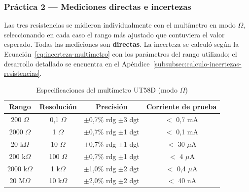 \subsubsection{Práctica 2 --- Mediciones directas e incertezas}

Las tres resistencias se midieron individualmente con el multímetro en modo $\Omega$, seleccionando en cada caso el rango más ajustado que contuviera el valor esperado.
Todas las mediciones son \textbf{directas}.
La incerteza se calculó según la Ecuación~\ref{eq:incerteza-multimetro} con los parámetros del rango utilizado; el desarrollo detallado se encuentra en el Apéndice~\ref{subsubsec:calculo-incertezas-resistencias}.

\begin{table}[H]
    \centering
    \caption{Especificaciones del multímetro UT58D (modo $\Omega$)}
    \label{tab:especificaciones-multimetro}
    \begin{tabular}{|c|c|c|c|}
        \hline
        \textbf{Rango} & \textbf{Resolución} & \textbf{Precisión} & \textbf{Corriente de prueba} \\ \hline
        200 $\Omega$   & 0{,}1 $\Omega$ & $\pm$0{,}7\% rdg $\pm$3 dgt & $<$ 0{,}7 mA \\ \hline
        2000 $\Omega$  & 1 $\Omega$     & $\pm$0{,}7\% rdg $\pm$1 dgt & $<$ 0{,}1 mA \\ \hline
        20 k$\Omega$   & 10 $\Omega$    & $\pm$0{,}7\% rdg $\pm$1 dgt & $<$ 30 $\mu$A \\ \hline
        200 k$\Omega$  & 100 $\Omega$   & $\pm$0{,}7\% rdg $\pm$1 dgt & $<$ 4 $\mu$A \\ \hline
        2000 k$\Omega$ & 1 k$\Omega$    & $\pm$1{,}0\% rdg $\pm$2 dgt & $<$ 0{,}4 $\mu$A \\ \hline
        20 M$\Omega$   & 10 k$\Omega$   & $\pm$2{,}0\% rdg $\pm$2 dgt & $<$ 40 nA \\ \hline
    \end{tabular}
\end{table}

